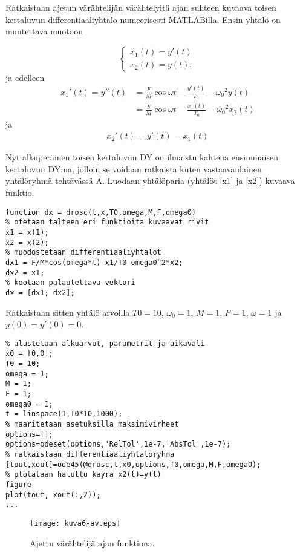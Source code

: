 \documentclass[a4paper,11pt]{article}
\begin{document}
Ratkaistaan ajetun värähtelijän värähtelyitä ajan suhteen kuvaava toisen kertaluvun differentiaaliyhtälö numeerisesti MATLABilla. Ensin yhtälö on muutettava muotoon

\begin{equation}
    \begin{cases}
    x_1(t) = y'(t) \\
    x_2(t) = y(t),
    \end{cases}
\end{equation}
ja edelleen
\begin{align}
\label{x1}
    x_1'(t) = y''(t) & = \frac{F}{M}\cos{\omega t}-\frac{y'(t)}{T_0}-{\omega_0}^2 y(t) \\
    & = \frac{F}{M}\cos{\omega t}-\frac{x_1(t)}{T_0}-{\omega_0}^2 x_2(t)
\end{align}
ja
\begin{align}
\label{x2}
    x_2'(t)=y'(t)=x_1(t)
\end{align}

Nyt alkuperäinen toisen kertaluvun DY on ilmaistu kahtena ensimmäisen kertaluvun DY:na, jolloin se voidaan ratkaista kuten vastaavanlainen yhtälöryhmä tehtävässä A. Luodaan yhtälöparia (yhtälöt \ref{x1} ja \ref{x2}) kuvaava funktio.

\begin{lstlisting}
function dx = drosc(t,x,T0,omega,M,F,omega0)
% otetaan talteen eri funktioita kuvaavat rivit
x1 = x(1);
x2 = x(2);
% muodostetaan differentiaaliyhtalot
dx1 = F/M*cos(omega*t)-x1/T0-omega0^2*x2;
dx2 = x1;
% kootaan palautettava vektori
dx = [dx1; dx2];
\end{lstlisting}

Ratkaistaan sitten yhtälö arvoilla $T0=10$, $\omega_0=1$, $M=1$, $F=1$, $\omega=1$ ja $y(0)=y'(0)=0$.

\begin{lstlisting}
% alustetaan alkuarvot, parametrit ja aikavali
x0 = [0,0];
T0 = 10;
omega = 1;
M = 1;
F = 1;
omega0 = 1;
t = linspace(1,T0*10,1000);
% maaritetaan asetuksilla maksimivirheet
options=[];
options=odeset(options,'RelTol',1e-7,'AbsTol',1e-7);
% ratkaistaan differentiaaliyhtaloryhma
[tout,xout]=ode45(@drosc,t,x0,options,T0,omega,M,F,omega0);
% plotataan haluttu kayra x2(t)=y(t)
figure
plot(tout, xout(:,2));
...
\end{lstlisting}

\begin{figure}[!htb]
    \centering
    \texttt{[image: kuva6-av.eps]}
    \caption{Ajettu värähtelijä ajan funktiona.}
    \label{fig:osc1}
\end{figure}
\end{document}
